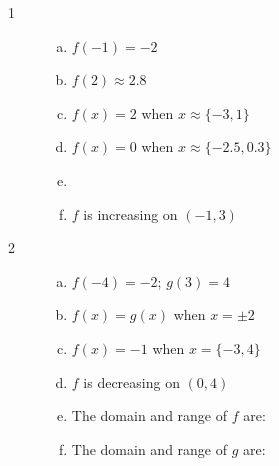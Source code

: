 \documentclass[letterpaper, landscape]{exam}
\begin{document}
    \begin{description}

      \item[1]
        \begin{enumerate}[(a)]
          \item $f(-1) = \boxed{ -2 }$
          \item $f(2) \approx \boxed{ 2.8 }$
          \item $f(x) = 2$ when $\boxed{ x \approx \{-3, 1 \} }$
          \item $f(x) = 0$ when $\boxed{ x \approx \{ -2.5, 0.3 \} }$
          \item 

          \item $f$ is increasing on $\boxed{ (-1, 3) }$
        \end{enumerate}

      \item[2]
        \begin{enumerate}[(a)]
          \item $f(-4) = \boxed{ -2 }$; $g(3) = \boxed{ 4 }$

          \item $f(x) = g(x)$ when $\boxed{ x = \pm 2 }$

          \item $f(x) = -1$ when $\boxed{ x = \{ -3, 4 \} }$

          \item $f$ is decreasing on $\boxed{ (0, 4) }$

          \item 
            The domain and range of $f$ are:

          \item 
            The domain and range of $g$ are:
        \end{enumerate}


\end{description}
\end{document}
